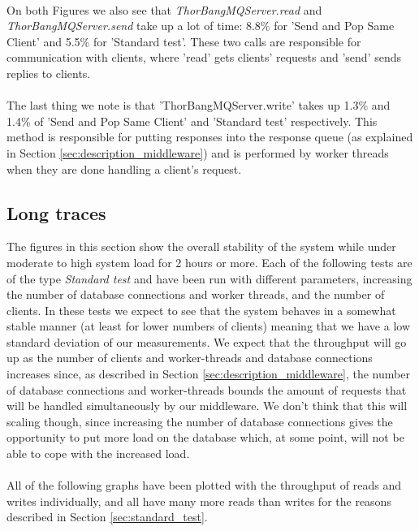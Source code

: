 \documentclass{article}
\begin{document}
            ~\\
            On both Figures we also see that \textit{ThorBangMQServer.read} and \textit{ThorBangMQServer.send} take up a lot of time: 8.8\% for 'Send and Pop Same Client' and 5.5\% for 'Standard test'. These two calls are responsible for communication with clients, where 'read' gets clients' requests and 'send' sends replies to clients.\\
            \\
            The last thing we note is that 'ThorBangMQServer.write' takes up 1.3\% and 1.4\% of 'Send and Pop Same Client' and 'Standard test' respectively. This method is responsible for putting responses into the response queue (as explained in Section \ref{sec:description_middleware}) and is performed by worker threads when they are done handling a client's request.


        \subsection{Long traces}
            The figures in this section show the overall stability of the system while under moderate to high system load for 2 hours or more. Each of the following tests are of the type \textit{Standard test} and have been run with different parameters, increasing the number of database connections and worker threads, and the number of clients. In these tests we expect to see that the system behaves in a somewhat stable manner (at least for lower numbers of clients) meaning that we have a low standard deviation of our measurements. We expect that the throughput will go up as the number of clients and worker-threads and database connections increases since, as described in Section \ref{sec:description_middleware}, the number of database connections and worker-threads bounds the amount of requests that will be handled simultaneously by our middleware. We don't think that this will scaling though, since increasing the number of database connections gives the opportunity to put more load on the database which, at some point, will not be able to cope with the increased load.\\
            \\
            All of the following graphs have been plotted with the throughput of reads and writes individually, and all have many more reads than writes for the reasons described in Section \ref{sec:standard_test}.\\
\end{document}
